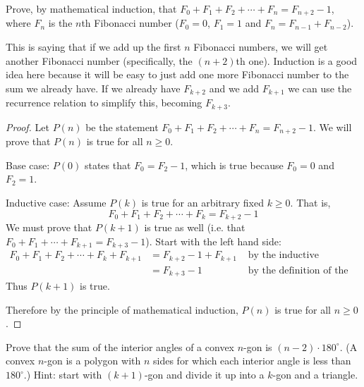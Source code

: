 \question[8] Prove, by mathematical induction, that $F_0 + F_1 + F_2 + \cdots + F_{n} = F_{n+2} - 1$, where $F_n$ is the $n$th Fibonacci number ($F_0 = 0$, $F_1 = 1$ and $F_n = F_{n-1} + F_{n-2}$).
\begin{solution}
This is saying that if we add up the first $n$ Fibonacci numbers, we will get another Fibonacci number (specifically, the $(n+2)$th one).  Induction is a good idea here because it will be easy to just add one more Fibonacci number to the sum we already have.  If we already have $F_{k+2}$ and we add $F_{k+1}$ we can use the recurrence relation to simplify this, becoming $F_{k+3}$.

  \begin{proof}
    Let $P(n)$ be the statement $F_0 + F_1 + F_2 + \cdots + F_n = F_{n+2} - 1$.  We will prove that $P(n)$ is true for all $n \ge 0$.

    Base case: $P(0)$ states that $F_0 = F_2 - 1$, which is true because $F_0 = 0$ and $F_2 = 1$.

    Inductive case:  Assume $P(k)$ is true for an arbitrary fixed $k \ge 0$.  That is, \[F_0 + F_1 + F_2 + \cdots + F_k = F_{k+2} - 1\]
    We must prove that $P(k+1)$ is true as well (i.e. that $F_0 + F_1 + \cdots +F_{k+1} = F_{k+3} - 1$).  Start with the left hand side:
    \begin{align*}
      F_0 + F_1 + F_2 + \cdots + F_k + F_{k+1} & = F_{k+2} - 1 + F_{k+1} & \mbox{ by the inductive hypothesis}\\
      & = F_{k+3} - 1 & \mbox{ by the definition of the Fibonacci numbers}
    \end{align*}
    Thus $P(k+1)$ is true.

    Therefore by the principle of mathematical induction, $P(n)$ is true for all $n \ge 0$.
  \end{proof}

\end{solution}

\question[8] Prove that the sum of the interior angles of a convex $n$-gon is $(n-2)\cdot 180^\circ$.  (A convex $n$-gon is a polygon with $n$ sides for which each interior angle is less than $180^\circ$.)  Hint: start with $(k+1)$-gon and divide it up into a $k$-gon and a triangle.

